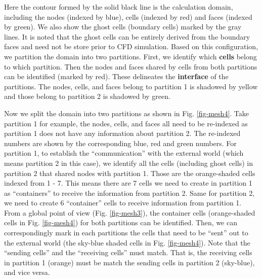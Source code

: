 \documentclass[11pt, letterpaper]{report}
\begin{document}
Here the contour formed by the solid black line is the calculation domain, including the nodes
(indexed by blue), cells (indexed by red) and faces (indexed by green). We also show the ghost cells
(boundary cells) marked by the gray lines. It is noted that the ghost cells can be entirely derived
from the boundary faces and need not be store prior to CFD simulation. Based on this configuration,
we partition the domain into two partitions. First, we identify which {\bf cells} belong to which
partition. Then the nodes and faces shared by cells from both partitions can be identified (marked
by red). These delineates the {\bf interface} of the partitions. The nodes, cells, and faces belong
to partition 1 is shadowed by yellow and those belong to partition 2 is shadowed by green.
\paraspace

Now we split the domain into two partitions as shown in Fig. \ref{fig-mesh4}. Take partition 1 for
example, the nodes, cells, and faces all need to be re-indexed as partition 1 does not have any
information about partition 2. The re-indexed numbers are shown by the corresponding blue, red and
green numbers. For partition 1, to establish the ``communication'' with the external world (which
means partition 2 in this case), we identify all the cells (including ghost cells) in partition 2
that shared nodes with partition 1. Those are the orange-shaded cells indexed from 1 - 7. This means
there are 7 cells we need to create in partition 1 as ``containers'' to receive the information from
partition 2. Same for partition 2, we need to create 6 ``container'' cells to receive information
from partition 1. From a global point of view (Fig. \ref{fig-mesh3}), the container cells
(orange-shaded cells in Fig. \ref{fig-mesh4}) for both partitions can be identified. Then, we can
correspondingly mark in each partitions the cells that need to be ``sent'' out to the external
world (the sky-blue shaded cells in Fig. \ref{fig-mesh4}). Note that the ``sending cells'' and the
``receiving cells'' must match. That is, the receiving cells in partition 1 (orange) must be match
the sending cells in partition 2 (sky-blue), and vice versa.
\end{document}
